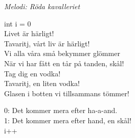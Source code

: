 {\footnotesize\textit{Melodi: Röda kavalleriet}}\par
\vspace{10pt}
int i = 0\\
\revrpt Livet är härligt!\\
Tavaritj, vårt liv är härligt!\\
Vi alla våra små bekymmer glömmer\\
När vi har fått en tår på tanden, skål!\\
Tag dig en vodka!\\
Tavaritj, en liten vodka!\\
Glasen i botten vi tillsammans tömmer!\par
\vspace{10pt}
0: Det kommer mera efter ha-a-and.\\
1: Det kommer mera efter hand, en skål!\\
i++\rpt

